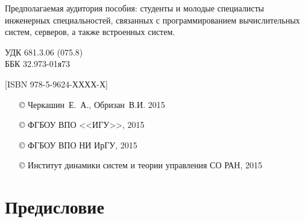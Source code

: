 \documentclass[14pt, openany, twoside, draft]{extbook} %
\newcommand{\e}[2][fcolor]{\textcolor{pcolor}{[}\textcolor{#1}{#2}\textcolor{pcolor}{]}}
\begin{document}
\begin{mygroup}
\begin{minipage}[t]{0.95\linewidth}
Предполагаемая аудитория пособия: студенты и молодые специалисты
инженерных специальностей, связанных с программированием
вычислительных систем, серверов, а также встроенных систем.

\mbox{}
\endgroup
\end{minipage}
\mbox{}\hspace{0.7\linewidth}
\begin{minipage}{0.3\linewidth}\small
\noindent УДК 681.3.06 (075.8)\\
\noindent ББК 32.973-01я73
\end{minipage}

\vfill
\noindent\begin{minipage}[t]{0.35\linewidth}\small
\noindent \e{ISBN 978-5-9624-ХХХХ-Х}
\end{minipage}%
\begin{minipage}[t]{0.65\linewidth}\small
\begin{itemize}
\setlength{\itemsep}{-0.5ex}
\setlength{\parsep}{0pt}
\item[\copyright{}] Черкашин~Е.~А., Обризан~В.И. 2015
\item[\copyright{}] ФГБОУ ВПО <<ИГУ>>, 2015
\item[\copyright{}] ФГБОУ ВПО НИ ИрГУ, 2015
\item[\copyright{}] Институт динамики систем и теории управления СО РАН, 2015
\end{itemize}
\end{minipage}
\end{mygroup}
\clearpage
\tableofcontents
\clearpage

\newpage
\chapter*{Предисловие}

\end{document}
